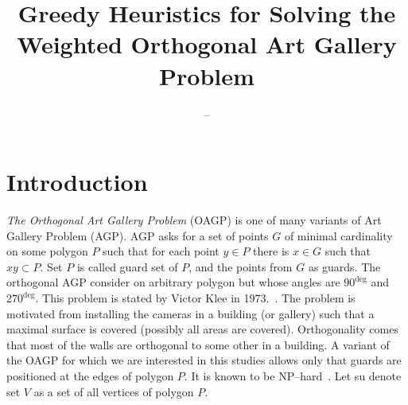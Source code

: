 \documentclass[runningheads,a4paper]{llncs}
\begin{document}
    \mainmatter  %

    \title{Greedy Heuristics for Solving the Weighted Orthogonal Art Gallery Problem}

    \author{--}

    \institute{%
    }

    \maketitle


    \section{Introduction}\label{sec:introduction}
     \emph{The Orthogonal Art Gallery Problem} (OAGP) is one of many variants of Art Gallery Problem (AGP). AGP asks for a set of points $G$ of minimal cardinality on some polygon $P$ such that for each point $y \in P$ there is $x \in G$ such that $xy \subset P$.  Set $P$ is called guard set of $P$, and the points from $G$ as guards. The orthogonal AGP consider on arbitrary polygon but whose angles are $90^{\deg}$ and $270^{\deg}$. This problem is stated by Victor  Klee in 1973.~\cite{o1987art}. The problem is motivated from installing the cameras in a building (or gallery) such that a maximal surface is covered (possibly all areas are covered). Orthogonality comes that most of the walls are orthogonal to some other in a building. A variant of the OAGP for which we are interested in this studies allows only that guards are positioned at the edges of polygon $P$. It is known to be NP--hard~\cite{devadoss2011discrete}. Let su denote set $V$ as a set of all vertices of polygon $P$.
     
\end{document}
